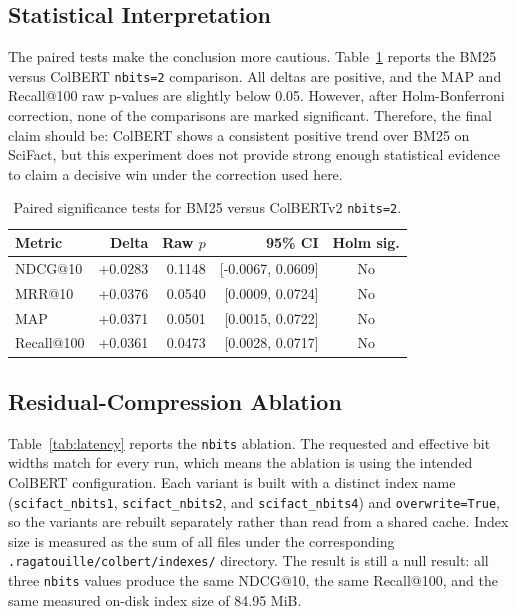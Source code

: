 \documentclass[sigconf,nonacm]{acmart}
\begin{document}
\subsection{Statistical Interpretation}

The paired tests make the conclusion more cautious. Table~\ref{tab:stats}
reports the BM25 versus ColBERT \texttt{nbits=2} comparison. All deltas are
positive, and the MAP and Recall@100 raw p-values are slightly below 0.05.
However, after Holm-Bonferroni correction, none of the comparisons are marked
significant. Therefore, the final claim should be: ColBERT shows a consistent
positive trend over BM25 on SciFact, but this experiment does not provide strong
enough statistical evidence to claim a decisive win under the correction used
here.

\begin{table}[h]
  \centering
  \caption{Paired significance tests for BM25 versus ColBERTv2 \texttt{nbits=2}.}
  \label{tab:stats}
  \begin{tabular}{lrrrc}
    \toprule
    Metric & Delta & Raw $p$ & 95\% CI & Holm sig. \\
    \midrule
    NDCG@10 & +0.0283 & 0.1148 & [-0.0067, 0.0609] & No \\
    MRR@10 & +0.0376 & 0.0540 & [0.0009, 0.0724] & No \\
    MAP & +0.0371 & 0.0501 & [0.0015, 0.0722] & No \\
    Recall@100 & +0.0361 & 0.0473 & [0.0028, 0.0717] & No \\
    \bottomrule
  \end{tabular}
\end{table}

\subsection{Residual-Compression Ablation}

Table~\ref{tab:latency} reports the \texttt{nbits} ablation. The requested and
effective bit widths match for every run, which means the ablation is using the
intended ColBERT configuration. Each variant is built with a distinct index name
(\texttt{scifact\_nbits1}, \texttt{scifact\_nbits2}, and
\texttt{scifact\_nbits4}) and \texttt{overwrite=True}, so the variants are
rebuilt separately rather than read from a shared cache. Index size is measured
as the sum of all files under the corresponding
\texttt{.ragatouille/colbert/indexes/} directory. The result is still a null
result: all three \texttt{nbits} values produce the same NDCG@10, the same
Recall@100, and the same measured on-disk index size of 84.95 MiB.
\end{document}
